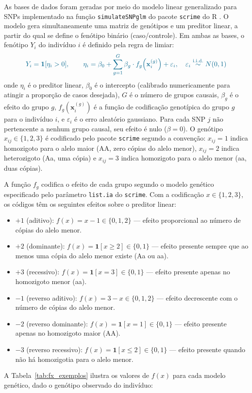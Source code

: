 \documentclass[
    12pt,
    a4paper,
    oneside,
    english,
    french,
    spanish,
    brazil
    ]{abntex2}
\newcommand{\novo}[1]{\textcolor{corNova}{#1}}
\begin{document}
\novo{As bases de dados foram geradas por meio do modelo linear generalizado para SNPs implementado na função \texttt{simulateSNPglm} do pacote \texttt{scrime} do R \cite{Team2013,Schwender2013,scrime2013}. O modelo gera simultaneamente uma matriz de genótipos e um preditor linear, a partir do qual se define o fenótipo binário (caso/controle). Em ambas as bases, o fenótipo $Y_i$ do indivíduo $i$ é definido pela regra de limiar:}
\begin{equation}
  \novo{Y_i = \mathbf{1}[\eta_i > 0], \qquad
  \eta_i = \beta_0 + \sum_{g=1}^{G} \beta_g \cdot f_g\!\left(\mathbf{x}_i^{(g)}\right) + \varepsilon_i,
  \quad \varepsilon_i \overset{\text{i.i.d.}}{\sim} N(0,1)}
  \label{eq:limiar}
\end{equation}
\novo{onde $\eta_i$ é o preditor linear, $\beta_0$ é o intercepto (calibrado numericamente para atingir a proporção de casos desejada), $G$ é o número de grupos causais, $\beta_g$ é o efeito do grupo $g$, $f_g(\mathbf{x}_i^{(g)})$ é a função de codificação genotípica do grupo $g$ para o indivíduo $i$, e $\varepsilon_i$ é o erro aleatório gaussiano. Para cada SNP $j$ não pertencente a nenhum grupo causal, seu efeito é nulo ($\beta = 0$). O genótipo $x_{ij} \in \{1, 2, 3\}$ é codificado pelo pacote \texttt{scrime} segundo a convenção: $x_{ij} = 1$ indica homozigoto para o alelo maior (AA, zero cópias do alelo menor), $x_{ij} = 2$ indica heterozigoto (Aa, uma cópia) e $x_{ij} = 3$ indica homozigoto para o alelo menor (aa, duas cópias).}

\novo{A função $f_g$ codifica o efeito de cada grupo segundo o modelo genético especificado pelo parâmetro \texttt{list.ia} do \texttt{scrime}. Com a codificação $x \in \{1, 2, 3\}$, os códigos têm os seguintes efeitos sobre o preditor linear:}
\begin{itemize}
  \item \novo{$+1$ (aditivo): $f(x) = x - 1 \in \{0, 1, 2\}$ --- efeito proporcional ao número de cópias do alelo menor.}
  \item \novo{$+2$ (dominante): $f(x) = \mathbf{1}[x \geq 2] \in \{0, 1\}$ --- efeito presente sempre que ao menos uma cópia do alelo menor existe (Aa ou aa).}
  \item \novo{$+3$ (recessivo): $f(x) = \mathbf{1}[x = 3] \in \{0, 1\}$ --- efeito presente apenas no homozigoto menor (aa).}
  \item \novo{$-1$ (reverso aditivo): $f(x) = 3 - x \in \{0, 1, 2\}$ --- efeito decrescente com o número de cópias do alelo menor.}
  \item \novo{$-2$ (reverso dominante): $f(x) = \mathbf{1}[x = 1] \in \{0, 1\}$ --- efeito presente apenas no homozigoto maior (AA).}
  \item \novo{$-3$ (reverso recessivo): $f(x) = \mathbf{1}[x \leq 2] \in \{0, 1\}$ --- efeito presente quando não há homozigotia para o alelo menor.}
\end{itemize}
\novo{A Tabela~\ref{tab:fx_exemplos} ilustra os valores de $f(x)$ para cada modelo genético, dado o genótipo observado do indivíduo:}
\end{document}
